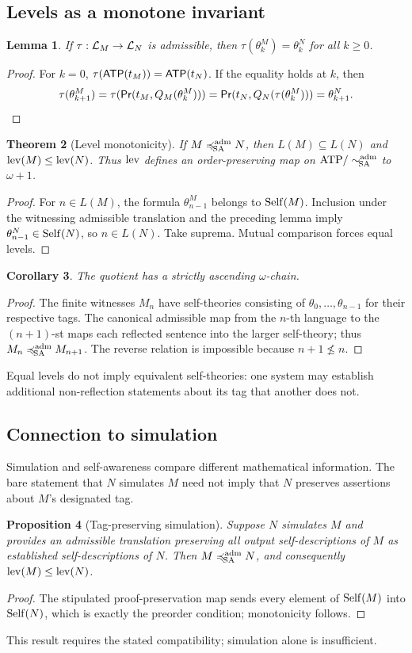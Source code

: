 \documentclass[11pt,letterpaper]{article}
\newtheorem{theorem}{Theorem}[section]\newtheorem{proposition}[theorem]{Proposition}\newtheorem{lemma}[theorem]{Lemma}\newtheorem{corollary}[theorem]{Corollary}\newtheorem{conjecture}[theorem]{Conjecture}\theoremstyle{definition}\newtheorem{definition}[theorem]{Definition}\newtheorem{example}[theorem]{Example}\newtheorem{remark}[theorem]{Remark}
\begin{document}
\subsection{Levels as a monotone invariant}
\begin{lemma}
If $\tau:\mathcal L_M\to\mathcal L_N$ is admissible, then $\tau(\theta_k^M)=\theta_k^N$ for all $k\ge0$.
\end{lemma}
\begin{proof}
For $k=0$, $\tau(\mathsf{ATP}(t_M))=\mathsf{ATP}(t_N)$. If the equality holds at $k$, then
\[
\tau(\theta_{k+1}^M)=\tau(\mathsf{Pr}(t_M,Q_M(\theta_k^M)))
=\mathsf{Pr}(t_N,Q_N(\tau(\theta_k^M)))=\theta_{k+1}^N.
\]
\end{proof}
\begin{theorem}[Level monotonicity]
If $M\preccurlyeq_{\!\mathrm{SA}}^{\mathrm{adm}} N$, then $L(M)\subseteq L(N)$ and $\operatorname{lev}(M)\le\operatorname{lev}(N)$. Thus $\operatorname{lev}$ defines an order-preserving map on $\mathrm{ATP}/\sim_{\!\mathrm{SA}}^{\mathrm{adm}}$ to $\omega+1$.
\end{theorem}
\begin{proof}
For $n\in L(M)$, the formula $\theta_{n-1}^M$ belongs to $\operatorname{Self}(M)$. Inclusion under the witnessing admissible translation and the preceding lemma imply $\theta_{n-1}^N\in\operatorname{Self}(N)$, so $n\in L(N)$. Take suprema. Mutual comparison forces equal levels.
\end{proof}
\begin{corollary}
The quotient has a strictly ascending $\omega$-chain.
\end{corollary}
\begin{proof}
The finite witnesses $M_n$ have self-theories consisting of $\theta_0,\ldots,\theta_{n-1}$ for their respective tags. The canonical admissible map from the $n$-th language to the $(n+1)$-st maps each reflected sentence into the larger self-theory; thus $M_n\preccurlyeq_{\!\mathrm{SA}}^{\mathrm{adm}} M_{n+1}$. The reverse relation is impossible because $n+1\nleq n$.
\end{proof}
Equal levels do not imply equivalent self-theories: one system may establish additional non-reflection statements about its tag that another does not.

\subsection{Connection to simulation}
Simulation and self-awareness compare different mathematical information. The bare statement that $N$ simulates $M$ need not imply that $N$ preserves assertions about $M$'s designated tag.
\begin{proposition}[Tag-preserving simulation]
Suppose $N$ simulates $M$ and provides an admissible translation preserving all output self-descriptions of $M$ as established self-descriptions of $N$. Then $M\preccurlyeq_{\!\mathrm{SA}}^{\mathrm{adm}} N$, and consequently $\operatorname{lev}(M)\le\operatorname{lev}(N)$.
\end{proposition}
\begin{proof}
The stipulated proof-preservation map sends every element of $\operatorname{Self}(M)$ into $\operatorname{Self}(N)$, which is exactly the preorder condition; monotonicity follows.
\end{proof}
This result requires the stated compatibility; simulation alone is insufficient.
\end{document}
